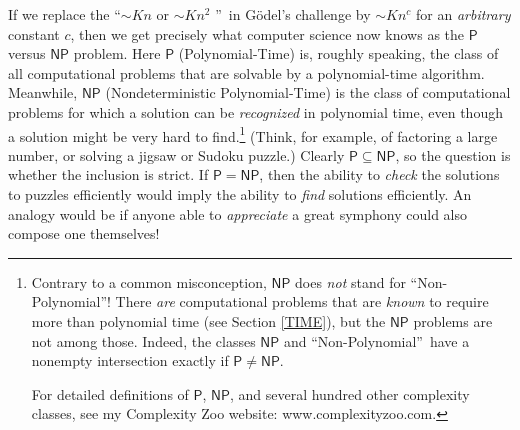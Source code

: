 \documentclass[12pt,onecolumn]{article}%
\begin{document}
If we replace the \textquotedblleft$\sim Kn$ or $\sim Kn^{2}$%
\textquotedblright\  in G\"{o}del's challenge by $\sim Kn^{c}$ for an
\textit{arbitrary} constant $c$, then we get precisely what computer science
now knows as the $\mathsf{P} $versus $\mathsf{NP}$ problem. Here
$\mathsf{P}$ (Polynomial-Time) is, roughly speaking, the class of all
computational problems that are solvable by a polynomial-time algorithm.
 Meanwhile, $\mathsf{NP}$ (Nondeterministic Polynomial-Time) is the class of
computational problems for which a solution can be \textit{recognized} in
polynomial time, even though a solution might be very hard to
find.\footnote{Contrary to a common misconception, $\mathsf{NP}$ does
\textit{not} stand for \textquotedblleft Non-Polynomial\textquotedblright !
 There \textit{are} computational problems that are \textit{known} to require
more than polynomial time (see Section \ref{TIME}), but the $\mathsf{NP}%
$ problems are not among those. Indeed, the classes $\mathsf{NP}$ and
\textquotedblleft Non-Polynomial\textquotedblright\  have a nonempty
intersection exactly if $\mathsf{P}\neq\mathsf{NP}$.
\par
For detailed definitions of $\mathsf{P}$, $\mathsf{NP}$, and several hundred
other complexity classes, see my Complexity Zoo website:
www.complexityzoo.com.} (Think, for example, of factoring a large number, or
solving a jigsaw or Sudoku puzzle.) Clearly $\mathsf{P}\subseteq\mathsf{NP}%
$, so the question is whether the inclusion is strict. If $\mathsf{P}%
=\mathsf{NP}$, then the ability to \textit{check} the solutions to puzzles
efficiently would imply the ability to \textit{find} solutions efficiently.
 An analogy would be if anyone able to \textit{appreciate} a great symphony
could also compose one themselves!
\end{document}
